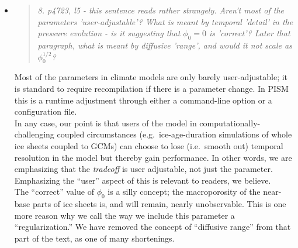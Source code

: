\documentclass[11pt,reqno]{amsart}
\newcommand{\reply}[2]{
\medskip\medskip
\item  \begin{quote}
\emph{#1}
\end{quote}

\medskip
\noindent #2}
\begin{document}
\begin{itemize}
\reply{8. p4723, l5 - this sentence reads rather strangely.  Aren't most of the parameters 'user-adjustable'?  What is meant by temporal 'detail' in the pressure evolution - is it suggesting that $\phi_0=0$ is 'correct'?  Later that paragraph, what is meant by diffusive 'range', and would it not scale as $\phi_0^{1/2}$?}
{Most of the parameters in climate models are only barely user-adjustable; it is standard to require recompilation if there is a parameter change.  In PISM this is a runtime adjustment through either a command-line option or a configuration file. \\
\indent In any case, our point is that users of the model in computationally-challenging coupled circumstances (e.g.~ice-age-duration simulations of whole ice sheets coupled to GCMs) can choose to lose (i.e.~smooth out) temporal resolution in the model but thereby gain performance.  In other words, we are emphasizing that the \emph{tradeoff} is user adjustable, not just the parameter.  Emphasizing the ``user'' aspect of this is relevant to readers, we believe.\\
\indent The ``correct'' value of $\phi_0$ is a silly concept; the macroporosity of the near-base parts of ice sheets is, and will remain, nearly unobservable.  This is one more reason why we call the way we include this parameter a ``regularization.''  We have removed the concept of ``diffusive range'' from that part of the text, as one of many shortenings.}


\end{itemize}
\end{document}
